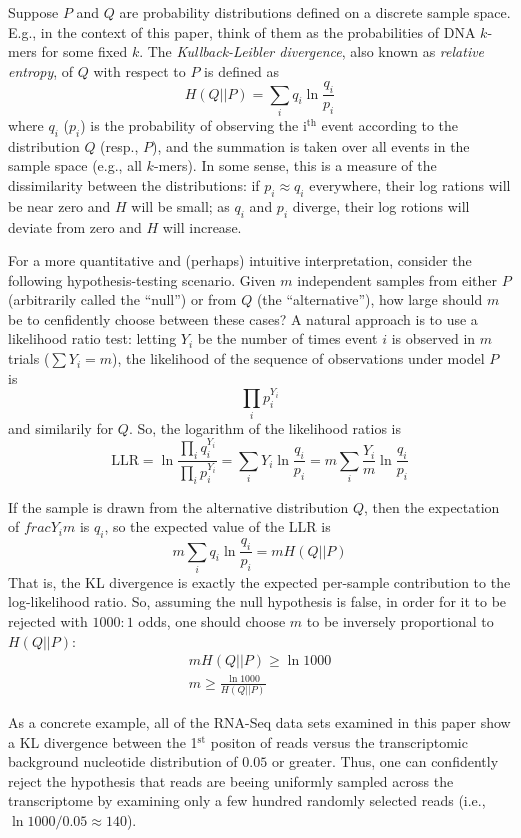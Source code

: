 \documentclass[letterpaper]{article}
\begin{document}
Suppose $P$ and $Q$ are probability distributions defined on a discrete sample
space. E.g., in the context of this paper, think of them as the probabilities of
DNA $k$-mers for some fixed $k$. The \emph{Kullback-Leibler divergence}, also
known as \emph{relative entropy}, of $Q$ with respect to $P$ is defined as
$$H(Q||P) = \sum_{i} q_i \ln \frac{q_{i}}{p_{i}}$$
where $q_{i}$ ($p_{i}$) is the probability of observing the i$^{\text{th}}$
event according to the distribution $Q$ (resp., $P$), and the summation is taken
over all events in the sample space (e.g., all $k$-mers). In some sense, this is
a measure of the dissimilarity between the distributions: if $p_{i} \approx
q_{i}$ everywhere, their log rations will be near zero and $H$ will be small; as
$q_{i}$ and $p_{i}$ diverge, their log rotions will deviate from zero and $H$
will increase.

For a more quantitative and (perhaps) intuitive interpretation, consider the
following hypothesis-testing scenario. Given $m$ independent samples from either
$P$ (arbitrarily called the ``null'') or from $Q$ (the ``alternative''), how
large should $m$ be to cenfidently choose between these cases? A natural
approach is to use a likelihood ratio test: letting $Y_i$ be the number of times
event $i$ is observed in $m$ trials ($\sum Y_i = m$), the likelihood of the
sequence of observations under model $P$ is $$\prod_{i} p_{i}^{Y_{i}}$$
and similarily for $Q$. So, the logarithm of the likelihood ratios is
$$
\text{LLR} =
\ln \frac{\prod_{i} q_{i} ^ {Y_{i}}}{\prod_{i} p_{i} ^ {Y_{i}}}
= \sum_{i} Y_{i} \ln \frac{q_{i}}{p_{i}}
= m \sum_{i} \frac{Y_{i}}{m} \ln \frac{q_{i}}{p_{i}} $$

If the sample is drawn from the alternative distribution $Q$, then the
expectation of $frac{Y_{i}}{m}$ is $q_i$, so the expected value of the LLR is
$$ m \sum_{i} q_{i} \ln \frac{q_{i}}{p_{i}} = m H(Q || P) $$
That is, the KL divergence is exactly the expected per-sample contribution to
the log-likelihood ratio.
So, assuming the null hypothesis is false, in order for it to be rejected with
$1000:1$ odds, one should choose $m$ to be inversely proportional to $H(Q ||
P)$:
\begin{align*}
m H(Q||P) \ge \ln 1000 \\
m \ge \frac{\ln 1000}{H(Q || P)}
\end{align*}

As a concrete example, all of the RNA-Seq data sets examined in this paper show
a KL divergence between the 1$^{\text{st}}$ positon of reads versus the
transcriptomic background nucleotide distribution of $0.05$ or greater. Thus,
one can confidently reject the hypothesis that reads are beeing uniformly
sampled across the transcriptome by examining only a few hundred randomly
selected reads (i.e., $\ln 1000 / 0.05 \approx 140$).
\end{document}

